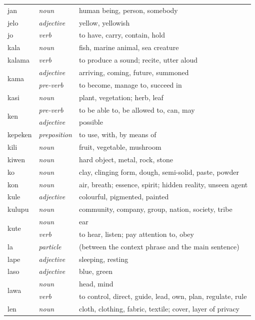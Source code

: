\documentclass[14pt, a4paper]{extreport}
\begin{document}
\begin{longtable}{llp{10cm}}
  jan & \textit{noun} & human being, person, somebody \\
  jelo & \textit{adjective} & yellow, yellowish \\
  jo & \textit{verb} & to have, carry, contain, hold \\
  kala & \textit{noun} & fish, marine animal, sea creature \\
  kalama & \textit{verb} & to produce a sound; recite, utter aloud \\
  \multirow[t]{2}{*}{kama} & \textit{adjective} & arriving, coming, future, summoned \\
  & \textit{pre-verb} & to become, manage to, succeed in \\
  kasi & \textit{noun} & plant, vegetation; herb, leaf \\
  \multirow[t]{2}{*}{ken} & \textit{pre-verb} & to be able to, be allowed to, can, may \\
  & \textit{adjective} & possible \\
  kepeken & \textit{preposition} & to use, with, by means of \\
  kili & \textit{noun} & fruit, vegetable, mushroom \\
  kiwen & \textit{noun} & hard object, metal, rock, stone \\
  ko & \textit{noun} & clay, clinging form, dough, semi-solid, paste, powder \\
  kon & \textit{noun} & air, breath; essence, spirit; hidden reality, unseen agent \\
  kule & \textit{adjective} & colourful, pigmented, painted \\
  kulupu & \textit{noun} & community, company, group, nation, society, tribe \\
  \multirow[t]{2}{*}{kute} & \textit{noun} & ear \\
  & \textit{verb} & to hear, listen; pay attention to, obey \\
  la & \textit{particle} & (between the context phrase and the main sentence) \\
  lape & \textit{adjective} & sleeping, resting \\
  laso & \textit{adjective} & blue, green \\
  \multirow[t]{2}{*}{lawa} & \textit{noun} & head, mind \\
  & \textit{verb} & to control, direct, guide, lead, own, plan, regulate, rule \\
  len & \textit{noun} & cloth, clothing, fabric, textile; cover, layer of privacy \\

\end{longtable}
\end{document}
